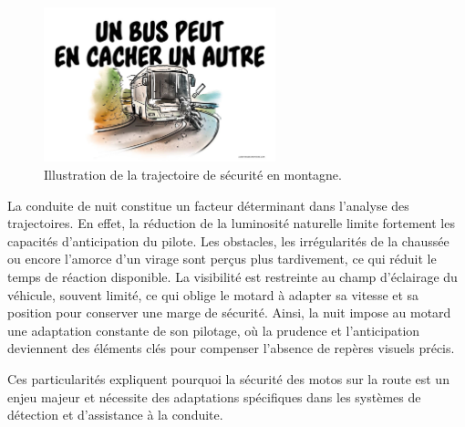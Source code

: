 \begin{figure}[H]
    \centering
    \includegraphics[width=0.6\textwidth]{etat_art/images/trajectoire-route-voie-bus-conduite_hd.jpg} 
    \caption{Illustration de la trajectoire de sécurité en montagne.}
\end{figure}
La conduite de nuit constitue un facteur déterminant dans l’analyse des trajectoires. En effet, la réduction de la luminosité naturelle limite fortement les capacités d’anticipation du pilote. Les obstacles, les irrégularités de la chaussée ou encore l’amorce d’un virage sont perçus plus tardivement, ce qui réduit le temps de réaction disponible. La visibilité est restreinte au champ d’éclairage du véhicule, souvent limité, ce qui oblige le motard à adapter sa vitesse et sa position pour conserver une marge de sécurité. 
Ainsi, la nuit impose au motard une adaptation constante de son pilotage, où la prudence et l’anticipation deviennent des éléments clés pour compenser l’absence de repères visuels précis.\\
\vspace{0.5cm}

Ces particularités expliquent pourquoi la sécurité des motos sur la route est un enjeu majeur et nécessite des adaptations spécifiques dans les systèmes de détection et d’assistance à la conduite. 

